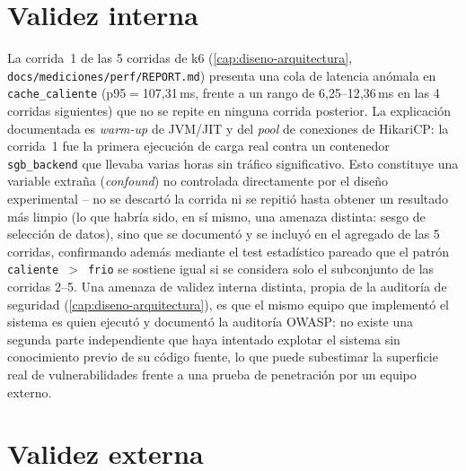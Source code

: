 \section{Validez interna}

La corrida~1 de las 5 corridas de k6 (\autoref{cap:diseno-arquitectura},
\texttt{docs/mediciones/perf/REPORT.md}) presenta una cola de latencia
anómala en \texttt{cache\_caliente} (p95$=$107{,}31\,ms, frente a un
rango de 6{,}25--12{,}36\,ms en las 4 corridas siguientes) que no se
repite en ninguna corrida posterior. La explicación documentada es
\emph{warm-up} de JVM/JIT y del \emph{pool} de conexiones de HikariCP:
la corrida~1 fue la primera ejecución de carga real contra un contenedor
\texttt{sgb\_backend} que llevaba varias horas sin tráfico significativo.
Esto constituye una variable extraña (\emph{confound}) no controlada
directamente por el diseño experimental -- no se descartó la corrida ni
se repitió hasta obtener un resultado más limpio (lo que habría sido, en
sí mismo, una amenaza distinta: sesgo de selección de datos), sino que
se documentó y se incluyó en el agregado de las 5 corridas, confirmando
además mediante el test estadístico pareado que el patrón
\texttt{caliente}~$>$~\texttt{frio} se sostiene igual si se considera
solo el subconjunto de las corridas 2--5. Una amenaza de validez interna
distinta, propia de la auditoría de seguridad
(\autoref{cap:diseno-arquitectura}), es que el mismo equipo que
implementó el sistema es quien ejecutó y documentó la auditoría OWASP: no
existe una segunda parte independiente que haya intentado explotar el
sistema sin conocimiento previo de su código fuente, lo que puede
subestimar la superficie real de vulnerabilidades frente a una prueba de
penetración por un equipo externo.

\section{Validez externa}
\label{sec:validez-externa}

